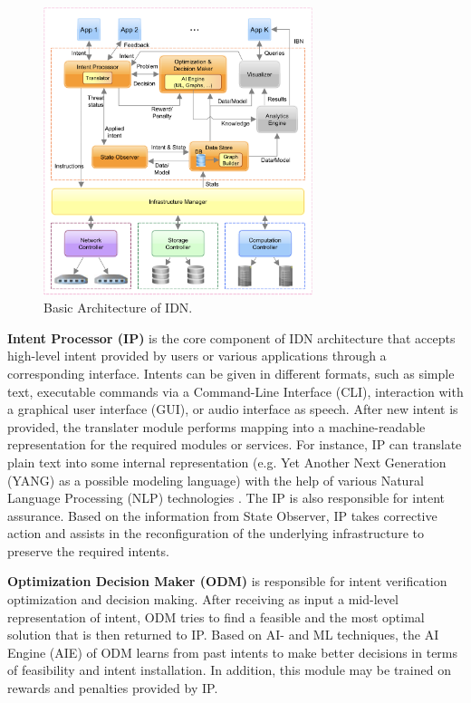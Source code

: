 \begin{figure}[htb]
  \centering
  \includegraphics[width=0.7\textwidth]{figures/IBN_Architecture.png}
  \caption{Basic Architecture of IDN. \cite{Saha2018}}
  \label{fig:IDN_Architecture}
\end{figure}

\textbf{Intent Processor (IP)} is the core component of IDN architecture that accepts high-level intent provided by users or various applications through a corresponding interface. Intents can be given in different formats, such as simple text, executable commands via a Command-Line Interface (CLI), interaction with a graphical user interface (GUI), or audio interface as speech. After new intent is provided, the translater module performs mapping into a machine-readable representation for the required modules or services. For instance, IP can translate plain text into some internal representation (e.g. Yet Another Next Generation (YANG) as a possible modeling language) with the help of various Natural Language Processing (NLP) technologies \cite[15]{Mehmood2021}. The IP is also responsible for intent assurance. Based on the information from State Observer, IP takes corrective action and assists in the reconfiguration of the underlying infrastructure to preserve the required intents.

\textbf{Optimization Decision Maker (ODM)} is responsible for intent verification optimization and decision making. After receiving as input a mid-level representation of intent, ODM tries to find a feasible and the most optimal solution that is then returned to IP. Based on AI- and ML techniques, the AI Engine (AIE) of ODM learns from past intents to make better decisions in terms of feasibility and intent installation. In addition, this module may be trained on rewards and penalties provided by IP.

